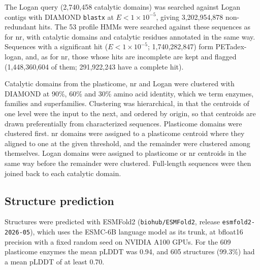 \documentclass[pdflatex,sn-nature,iicol]{sn-jnl}%
\begin{document}
The Logan query (2,740,458 catalytic domains) was searched against Logan contigs \citep{chikhi2024logan} with DIAMOND \texttt{blastx} at $E < 1\times10^{-5}$, giving 3,202,954,878 non-redundant hits. The 53 profile HMMs were searched against these sequences as for nr, with catalytic domains and catalytic residues annotated in the same way. Sequences with a significant hit ($E < 1\times10^{-5}$; 1,740,282,847) form PETadex-logan, and, as for nr, those whose hits are incomplete are kept and flagged (1,448,360,604 of them; 291,922,243 have a complete hit). %

Catalytic domains from the plasticome, nr and Logan were clustered with DIAMOND at 90\%, 60\% and 30\% amino acid identity, which we term enzymes, families and superfamilies. Clustering was hierarchical, in that the centroids of one level were the input to the next, and ordered by origin, so that centroids are drawn preferentially from characterized sequences. Plasticome domains were clustered first. nr domains were assigned to a plasticome centroid where they aligned to one at the given threshold, and the remainder were clustered among themselves. Logan domains were assigned to plasticome or nr centroids in the same way before the remainder were clustered. Full-length sequences were then joined back to each catalytic domain. %

\subsection{Structure prediction}

Structures were predicted with ESMFold2 (\texttt{biohub/ESMFold2}, release \texttt{esmfold2-2026-05}), which uses the ESMC-6B language model as its trunk, at bfloat16 precision with a fixed random seed on NVIDIA A100 GPUs. For the 609 plasticome enzymes the mean pLDDT was 0.94, and 605 structures (99.3\%) had a mean pLDDT of at least 0.70. %
\end{document}
